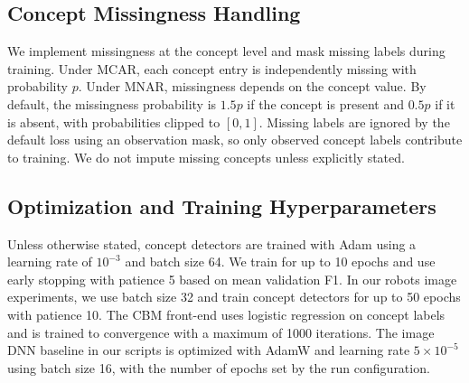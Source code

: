 \subsection{Concept Missingness Handling}
We implement missingness at the concept level and mask missing labels during training. Under MCAR, each concept entry is independently missing with probability $p$. Under MNAR, missingness depends on the concept value. By default, the missingness probability is $1.5p$ if the concept is present and $0.5p$ if it is absent, with probabilities clipped to $[0,1]$. Missing labels are ignored by the default loss using an observation mask, so only observed concept labels contribute to training. We do not impute missing concepts unless explicitly stated.

\subsection{Optimization and Training Hyperparameters}
Unless otherwise stated, concept detectors are trained with Adam using a learning rate of $10^{-3}$ and batch size 64. We train for up to 10 epochs and use early stopping with patience 5 based on mean validation F1. In our robots image experiments, we use batch size 32 and train concept detectors for up to 50 epochs with patience 10. The CBM front-end uses logistic regression on concept labels and is trained to convergence with a maximum of 1000 iterations. The image DNN baseline in our scripts is optimized with AdamW and learning rate $5\times 10^{-5}$ using batch size 16, with the number of epochs set by the run configuration. 





